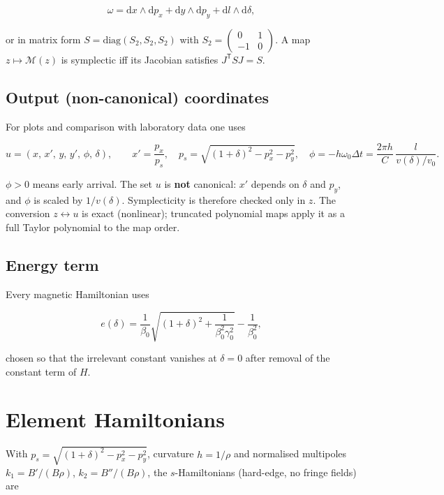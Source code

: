\documentclass[11pt,a4paper]{article}
\begin{document}
\[
\omega=\mathrm{d}x\wedge\mathrm{d}p_x+\mathrm{d}y\wedge\mathrm{d}p_y+\mathrm{d}l\wedge\mathrm{d}\delta,
\]

or in matrix form $S=\mathrm{diag}(S_2,S_2,S_2)$ with
$S_2=\begin{pmatrix}0&1\\-1&0\end{pmatrix}$. A map $z\mapsto\mathcal{M}(z)$
is symplectic iff its Jacobian satisfies $J^\mathsf{T}SJ=S$.

\subsection{Output (non-canonical) coordinates}

For plots and comparison with laboratory data one uses

\[
u=(x,\,x',\,y,\,y',\,\phi,\,\delta),\qquad
x'=\frac{p_x}{p_s},\quad
p_s=\sqrt{(1+\delta)^2-p_x^2-p_y^2},\quad
\phi=-h\omega_0\Delta t=\frac{2\pi h}{C}\,\frac{l}{v(\delta)/v_0}.
\]

$\phi>0$ means early arrival. The set $u$ is \textbf{not} canonical:
$x'$ depends on $\delta$ and $p_y$, and $\phi$ is scaled by
$1/v(\delta)$. Symplecticity is therefore checked only in $z$. The
conversion $z\leftrightarrow u$ is exact (nonlinear); truncated polynomial
maps apply it as a full Taylor polynomial to the map order.

\subsection{Energy term}

Every magnetic Hamiltonian uses

\[
e(\delta)=\frac{1}{\beta_0}\sqrt{(1+\delta)^2+\frac{1}{\beta_0^2\gamma_0^2}}-\frac{1}{\beta_0^2},
\]

chosen so that the irrelevant constant vanishes at $\delta=0$ after removal
of the constant term of $H$.
\clearpage
\section{Element Hamiltonians}

With $p_s=\sqrt{(1+\delta)^2-p_x^2-p_y^2}$, curvature $h=1/\rho$ and
normalised multipoles $k_1=B'/(B\rho)$, $k_2=B''/(B\rho)$, the
$s$-Hamiltonians (hard-edge, no fringe fields) are
\end{document}
